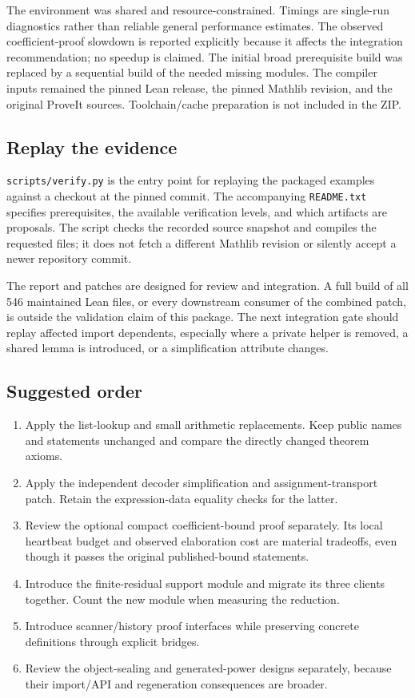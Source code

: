 \documentclass[11pt,letterpaper]{article}
\newcommand{\artifact}[1]{\nolinkurl{#1}}
\begin{document}
The environment was shared and resource-constrained. Timings are single-run diagnostics rather than reliable general performance estimates. The observed coefficient-proof slowdown is reported explicitly because it affects the integration recommendation; no speedup is claimed. The initial broad prerequisite build was replaced by a
sequential build of the needed missing modules. The compiler inputs remained
the pinned Lean release, the pinned Mathlib revision, and the original
ProveIt sources. Toolchain/cache preparation is not included in the ZIP.

\subsection{Replay the evidence}

\artifact{scripts/verify.py} is the entry point for replaying the packaged
examples against a checkout at the pinned commit. The accompanying
\artifact{README.txt} specifies prerequisites, the available verification
levels, and which artifacts are proposals. The script checks the recorded
source snapshot and compiles the requested files; it does not fetch a
different Mathlib revision or silently accept a newer repository commit.

The report and patches are designed for review and integration. A full
build of all 546 maintained Lean files, or every downstream consumer of
the combined patch, is outside the validation claim of this package.
The next integration gate should replay affected import dependents,
especially where a private helper is removed, a shared lemma is introduced,
or a simplification attribute changes.

\subsection{Suggested order}

\begin{enumerate}
\item Apply the list-lookup and small arithmetic replacements. Keep public
names and statements unchanged and compare the directly changed theorem
axioms.
\item Apply the independent decoder simplification and assignment-transport
patch. Retain the expression-data equality checks for the latter.
\item Review the optional compact coefficient-bound proof separately. Its local heartbeat budget and observed elaboration cost are material tradeoffs, even though it passes the original published-bound statements.
\item Introduce the finite-residual support module and migrate its three
clients together. Count the new module when measuring the reduction.
\item Introduce scanner/history proof interfaces while preserving concrete
definitions through explicit bridges.
\item Review the object-sealing and generated-power designs separately,
because their import/API and regeneration consequences are broader.
\end{enumerate}
\end{document}

